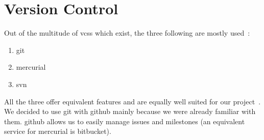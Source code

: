\section{Version Control}

Out of the multitude of \glspl{vcs} which exist, the
three following are mostly used~\cite{rhodecodeVCS}:

\begin{enumerate} \item \gls{git} \item \gls{mercurial} \item \gls{svn}
\end{enumerate}

All the three offer equivalent features and are equally well suited for our
project~\cite{thomson2008relax}. We decided to use \gls{git} with \gls{github}
mainly because we were already familiar with them. \Gls{github} allows us to
easily manage issues and milestones (an equivalent service for mercurial is
\gls{bitbucket}).
